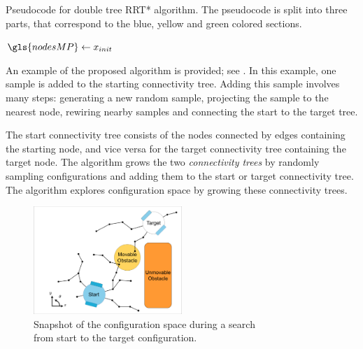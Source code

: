 \begin{algorithm}[H]
\caption{Pseudocode for double tree \ac{RRT*} algorithm. The pseudocode is split into three parts,  that correspond to the blue, yellow and green colored sections.}%
\label{pseudocode:proposed_rrt_star_all}
\begin{algorithmic}[1]

\hspace{-0.9cm}\colorbox{my_grey}{\parbox{\linewidth}{%
\State $\gls{nodesMP} \leftarrow x_{init}$

\hspace{-0.1cm}\colorbox{my_light_blue}{\parbox{\linewidth}{%
}}

\hspace{-0.1cm}\colorbox{my_yellow}{\parbox{\linewidth}{%
}}

\hspace{-0.1cm}\colorbox{my_green}{\parbox{\linewidth}{%
}}
\EndWhile
}}
\end{algorithmic}
\end{algorithm}



An example of the proposed algorithm is provided; see . In this example, one sample is added to the starting connectivity tree. Adding this sample involves many steps: generating a new random sample, projecting the sample to the nearest node, rewiring nearby samples and connecting the start to the target tree.\bs

The start connectivity tree consists of the nodes connected by edges containing the starting node, and vice versa for the target connectivity tree containing the target node. The algorithm grows the two \textit{connectivity trees} by randomly sampling configurations and adding them to the start or target connectivity tree. The algorithm explores configuration space by growing these connectivity trees. 


\begin{figure}[H]
    \centering
    \includegraphics[width=0.5\textwidth, cfbox=my_grey 5pt 0pt]{figures/required_background/mp/1mp_init.drawio.png}
    \caption{Snapshot of the configuration space during a search\\from start to the target configuration.}
    \label{fig:motion_planner_adding_one_sample_all}
\end{figure}

